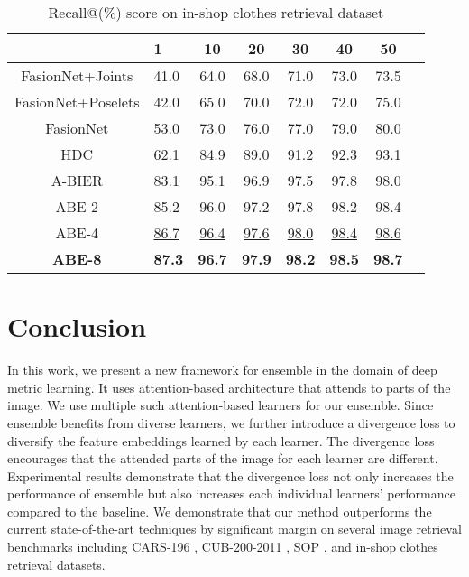 \documentclass[runningheads]{llncs}
\begin{document}
\setlength{\tabcolsep}{4pt}
\begin{table}
\begin{center}
\caption{Recall@(\%) score on in-shop clothes retrieval dataset}
\vspace{-1mm}
\label{table:inshopcomptable}
\scriptsize
\begin{tabular}{Sl cccccc}
\hline
 & 1 & 10 & 20 & 30 & 40 & 50\\
\hline
FasionNet+Joints \cite{liu2016deepfashion} & 41.0 & 64.0 & 68.0 & 71.0 & 73.0 & 73.5  \\
FasionNet+Poselets \cite{liu2016deepfashion} & 42.0 & 65.0 & 70.0 & 72.0 & 72.0 & 75.0  \\
FasionNet \cite{liu2016deepfashion} & 53.0 & 73.0 & 76.0 & 77.0 & 79.0 & 80.0  \\
HDC \cite{yuan2016hard} & 62.1 & 84.9 & 89.0 & 91.2 & 92.3 & 93.1  \\
A-BIER \cite{opitz2018deep} & 83.1 & 95.1 & 96.9 & 97.5 & 97.8 & 98.0  \\
\hline
ABE-2 & 85.2 & 96.0 & 97.2 & 97.8 & 98.2 & 98.4  \\
ABE-4 & \underline{86.7} & \underline{96.4} & \underline{97.6} & \underline{98.0} & \underline{98.4} & \underline{98.6}  \\
\textbf{ABE-8} & \textbf{87.3} & \textbf{96.7} & \textbf{97.9} & \textbf{98.2} & \textbf{98.5} & \textbf{98.7}  \\

\hline
\end{tabular}
\vspace{-2mm}
\end{center}
\end{table}
\setlength{\tabcolsep}{1.4pt}
 
\section{Conclusion}
In this work, we present a new framework for ensemble in the domain of deep metric learning.
It uses attention-based architecture that attends to parts of the image.
We use multiple such attention-based learners for our ensemble.
Since ensemble benefits from diverse learners,
we further introduce a divergence loss to diversify the feature embeddings learned by each learner.
The divergence loss encourages that the attended parts of the image for each learner are different.
Experimental results demonstrate that the divergence loss not only increases the performance of ensemble
but also increases each individual learners' performance compared to the baseline.
We demonstrate that our method outperforms the current state-of-the-art techniques by significant margin
on several image retrieval benchmarks including CARS-196 \cite{KrauseStarkDengFei-Fei_3DRR2013},
CUB-200-2011 \cite{WahCUB_200_2011}, SOP \cite{oh2016deep}, and in-shop clothes retrieval \cite{liu2016deepfashion} datasets.
 
\end{document}
